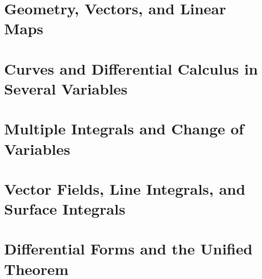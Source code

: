 \documentclass[11pt, openright]{book}
\begin{document}
\frontmatter




\tableofcontents

\mainmatter

\part{Geometry, Vectors, and Linear Maps}





\part{Curves and Differential Calculus in Several Variables}






\part{Multiple Integrals and Change of Variables}




\part{Vector Fields, Line Integrals, and Surface Integrals}




\part{Differential Forms and the Unified Theorem}



\end{document}
